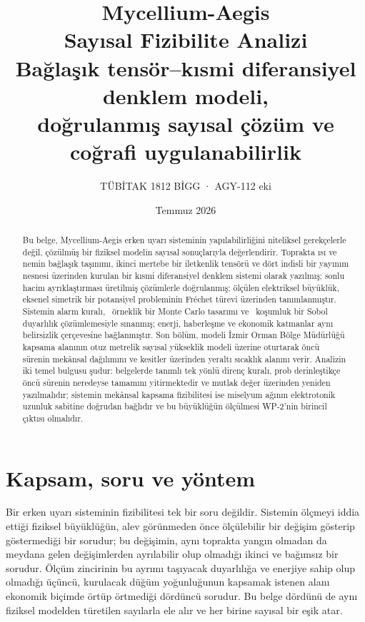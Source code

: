 \documentclass[11pt,a4paper]{article}
\title{\vspace{-1.5cm}\Large Mycellium-Aegis\\[.25em]
\huge Sayısal Fizibilite Analizi\\[.5em]
\large\normalfont Bağlaşık tensör--kısmi diferansiyel denklem modeli,\\
doğrulanmış sayısal çözüm ve coğrafi uygulanabilirlik}
\author{\normalsize TÜBİTAK 1812 BİGG · AGY-112 eki}
\date{\normalsize Temmuz 2026}
\begin{document}
\maketitle
\thispagestyle{empty}

\begin{abstract}\noindent
Bu belge, Mycellium-Aegis erken uyarı sisteminin yapılabilirliğini niteliksel
gerekçelerle değil, çözülmüş bir fiziksel modelin sayısal sonuçlarıyla
değerlendirir. Toprakta ısı ve nemin bağlaşık taşınımı, ikinci mertebe bir
iletkenlik tensörü ve dört indisli bir yayınım nesnesi üzerinden kurulan bir
kısmi diferansiyel denklem sistemi olarak yazılmış; sonlu hacim ayrıklaştırması
üretilmiş çözümlerle doğrulanmış; ölçülen elektriksel büyüklük, eksenel simetrik
bir potansiyel probleminin Fréchet türevi üzerinden tanımlanmıştır. Sistemin
alarm kuralı, \mcPos\ örneklik bir Monte Carlo tasarımı ve \sobolRuns\ koşumluk
bir Sobol duyarlılık çözümlemesiyle sınanmış; enerji, haberleşme ve ekonomik
katmanlar aynı belirsizlik çerçevesine bağlanmıştır. Son bölüm, modeli İzmir
Orman Bölge Müdürlüğü kapsama alanının otuz metrelik sayısal yükseklik modeli
üzerine oturtarak öncü sürenin mekânsal dağılımını ve kesitler üzerinden
yeraltı sıcaklık alanını verir. Analizin iki temel bulgusu şudur: belgelerde
tanımlı tek yönlü direnç kuralı, prob derinleştikçe öncü sürenin neredeyse
tamamını yitirmektedir ve mutlak değer üzerinden yeniden yazılmalıdır; sistemin
mekânsal kapsama fizibilitesi ise miselyum ağının elektrotonik uzunluk sabitine
doğrudan bağlıdır ve bu büyüklüğün ölçülmesi WP-2'nin birincil çıktısı
olmalıdır.
\end{abstract}

\vspace{.4em}
{\small\tableofcontents}
\newpage

\section{Kapsam, soru ve yöntem}

Bir erken uyarı sisteminin fizibilitesi tek bir soru değildir. Sistemin
ölçmeyi iddia ettiği fiziksel büyüklüğün, alev görünmeden önce ölçülebilir
bir değişim gösterip göstermediği bir sorudur; bu değişimin, aynı toprakta
yangın olmadan da meydana gelen değişimlerden ayrılabilir olup olmadığı ikinci
ve bağımsız bir sorudur. Ölçüm zincirinin bu ayrımı taşıyacak duyarlılığa ve
enerjiye sahip olup olmadığı üçüncü, kurulacak düğüm yoğunluğunun kapsamak
istenen alanı ekonomik biçimde örtüp örtmediği dördüncü sorudur. Bu belge
dördünü de aynı fiziksel modelden türetilen sayılarla ele alır ve her birine
sayısal bir eşik atar.
\end{document}
